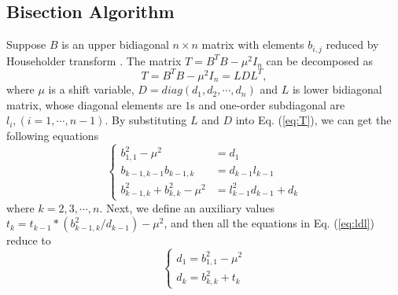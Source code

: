 \subsection{Bisection Algorithm}
\vspace{-0.1in}
Suppose $B$ is an upper bidiagonal $n \times n$ matrix with elements $b_{i,j}$ reduced by Householder transform \cite{10householder}.
The matrix $T = B^T B - \mu^2 I_n$ can be decomposed as
\begin{equation}
\label{eq:T}
T = B^T B - \mu^2 I_n = L D L^T ,
\end{equation}
where $\mu$ is a shift variable, $D=diag(d_1,d_2,\cdots,d_n)$ and $L$ is lower bidiagonal matrix, whose diagonal elements are $1$s and one-order subdiagonal are $l_{i}, (i=1,\cdots,n-1)$.
By substituting $L$ and $D$ into Eq. (\ref{eq:T}), we can get the following equations
\[ \left \{ \begin{aligned}
b_{1,1}^2 - \mu^2 &= d_1\\
b_{k-1,k-1} b_{k-1,k} &= d_{k-1} l_{k-1}\\
b_{k-1,k}^2 + b_{k,k}^2 - \mu^2 &= l_{k-1}^2 d_{k-1} + d_k
\end{aligned} \right . \label{eq:ldl} \]
where $k = 2,3,\cdots,n$.
Next, we define an auxiliary values $t_{k} = t_{k-1} * (b_{k-1,k}^2 / d_{k-1}) - \mu^2$, and then all the equations in Eq. (\ref{eq:ldl}) reduce to
\begin{equation}
\left \{
\begin{aligned}
d_1 = b_{1,1}^2 - \mu^2 \\
d_k = b_{k,k}^2 + t_{k}
\end{aligned}
\right .
\label{eq:negcount}
\end{equation}


